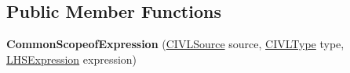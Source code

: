 \subsection*{Public Member Functions}
\begin{DoxyCompactItemize}
\item 
\hypertarget{classedu_1_1udel_1_1cis_1_1vsl_1_1civl_1_1model_1_1common_1_1expression_1_1CommonScopeofExpression_a3165b1a2d02d2fd5aea77e945d9bb2cf}{}{\bfseries Common\+Scopeof\+Expression} (\hyperlink{interfaceedu_1_1udel_1_1cis_1_1vsl_1_1civl_1_1model_1_1IF_1_1CIVLSource}{C\+I\+V\+L\+Source} source, \hyperlink{interfaceedu_1_1udel_1_1cis_1_1vsl_1_1civl_1_1model_1_1IF_1_1type_1_1CIVLType}{C\+I\+V\+L\+Type} type, \hyperlink{interfaceedu_1_1udel_1_1cis_1_1vsl_1_1civl_1_1model_1_1IF_1_1expression_1_1LHSExpression}{L\+H\+S\+Expression} expression)\label{classedu_1_1udel_1_1cis_1_1vsl_1_1civl_1_1model_1_1common_1_1expression_1_1CommonScopeofExpression_a3165b1a2d02d2fd5aea77e945d9bb2cf}


\end{DoxyCompactItemize}
